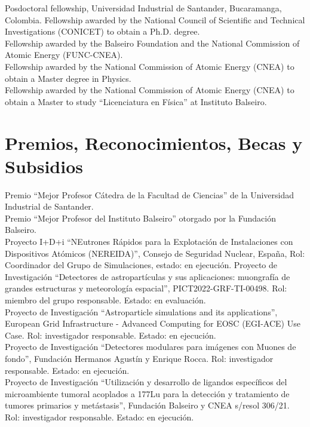  Posdoctoral fellowship, Universidad Industrial de Santander, Bucaramanga, Colombia.
 Fellowship awarded by the National Council of Scientific and Technical Investigations (CONICET) to obtain a Ph.D. degree.\\
 Fellowship awarded by the Balseiro Foundation and the National Commission of Atomic Energy (FUNC-CNEA).\\
 Fellowship awarded by the National Commission of Atomic Energy (CNEA) to obtain a Master degree in Physics.\\
 Fellowship awarded by the National Commission of Atomic Energy (CNEA) to obtain a Master to study ``Licenciatura en Física'' at Instituto Balseiro.\\
\fi
\else
\section*{Premios, Reconocimientos, Becas y Subsidios}
\noindent
{} Premio ``Mejor Profesor Cátedra de la Facultad de Ciencias'' de la Universidad Industrial de Santander.\\
 Premio ``Mejor Profesor del Instituto Balseiro'' otorgado por la Fundación Balseiro.\\
 Proyecto I+D+i ``NEutrones Rápidos para la Explotación de Instalaciones con Dispositivos Atómicos (NEREIDA)'', Consejo de Seguridad Nuclear, España, Rol: Coordinador del Grupo de Simulaciones, estado: en ejecución.
 Proyecto de Investigación ``Detectores de astropartículas y sus aplicaciones: muongrafía de grandes estructuras y meteorología espacial'', PICT2022-GRF-TI-00498. Rol: miembro del grupo responsable. Estado: en evaluación.\\
 Proyecto de Investigación ``Astroparticle simulations and its applications'', European Grid Infrastructure - Advanced Computing for EOSC (EGI-ACE) Use Case. Rol: investigador responsable. Estado: en ejecución.\\
 Proyecto de Investigación ``Detectores modulares para imágenes con Muones de fondo'', Fundación Hermanos Agustín y Enrique Rocca. Rol: investigador responsable. Estado: en ejecución.\\
 Proyecto de Investigación ``Utilización y desarrollo de ligandos específicos del microambiente tumoral acoplados a 177Lu para la detección y tratamiento de tumores primarios y metástasis'', Fundación Balseiro y CNEA s/resol 306/21. Rol: investigador responsable. Estado: en ejecución.\\
